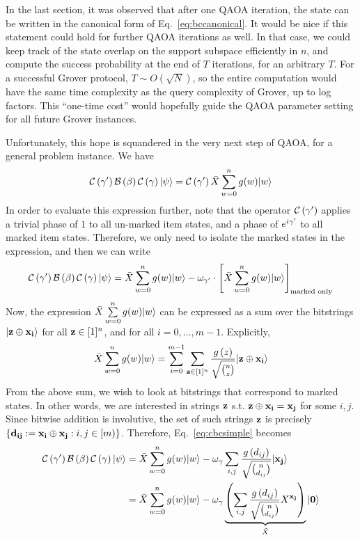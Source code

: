 \documentclass[11pt]{article}
\begin{document}
In the last section, it was observed that after one QAOA iteration, the state can be written in the canonical form of Eq.~\ref{eq:bccanonical}. It would be nice if this statement could hold for further QAOA iterations as well. In that case, we could keep track of the state overlap on the support subspace efficiently in $n$, and compute the success probability at the end of $T$ iterations, for an arbitrary $T$. For a successful Grover protocol, $T\sim O(\sqrt{N})$, so the entire computation would have the same time complexity as the query complexity of Grover, up to log factors. This ``one-time cost'' would hopefully guide the QAOA parameter setting for all future Grover instances.

Unfortunately, this hope is squandered in the very next step of QAOA, for a general problem instance. We have
\begin{equation}
  \label{eq:cbc}
  \mathcal{C}\left(\gamma^\prime\right)\mathcal{B}\left(\beta\right)\mathcal{C}\left(\gamma\right)|\psi\rangle = \mathcal{C}\left(\gamma^\prime\right)\bar{X}\sum\limits_{w=0}^{n}g(w)|w\rangle
\end{equation}
In order to evaluate this expression further, note that the operator $\mathcal{C}\left(\gamma^\prime\right)$ applies a trivial phase of $1$ to all un-marked item states, and a phase of $e^{i\gamma^\prime}$ to all marked item states. Therefore, we only need to isolate the marked states in the expression, and then we can write
\begin{equation}
  \label{eq:cbcsimple}
  \mathcal{C}\left(\gamma^\prime\right)\mathcal{B}\left(\beta\right)\mathcal{C}\left(\gamma\right)|\psi\rangle = \bar{X}\sum\limits_{w=0}^{n}g(w)|w\rangle - \omega_{\gamma^\prime}\cdot\left[\bar{X}\sum\limits_{w=0}^{n}g(w)|w\rangle\right]_{\text{marked only}}
\end{equation}
Now, the expression $\bar{X}\sum\limits_{w=0}^{n}g(w)|w\rangle$ can be expressed as a sum over the bitstrings $|\mathbf{z}\oplus \mathbf{x_i}\rangle$ for all $\mathbf{z}\in[1]^n$, and for all $i=0,\ldots,m-1$. Explicitly, 
$$
\bar{X}\sum\limits_{w=0}^{n}g(w)|w\rangle = \sum\limits_{i=0}^{m-1}\sum\limits_{\mathbf{z}\in[1]^n}^{}\frac{g\left(z\right)}{\sqrt{\binom{n}{z}}}|\mathbf{z}\oplus \mathbf{x_i}\rangle
$$
From the above sum, we wish to look at bitstrings that correspond to marked states. In other words, we are interested in strings $\mathbf{z}$ s.t. $\mathbf{z}\oplus \mathbf{x_i} =\mathbf{x_j} $ for some $i,j$. Since bitwise addition is involutive, the set of such strings $\mathbf{z}$ is precisely $\left\{\mathbf{d_{ij}}:=\mathbf{x_i}\oplus\mathbf{x_j}: i,j\in [m)\right\}$. Therefore, Eq.~\ref{eq:cbcsimple} becomes
\begin{align}
  \label{eq:cbcfinal}
  \mathcal{C}\left(\gamma^\prime\right)\mathcal{B}\left(\beta\right)\mathcal{C}\left(\gamma\right)|\psi\rangle &= \bar{X}\sum\limits_{w=0}^{n}g(w)|w\rangle - \omega_\gamma\sum\limits_{i,j}^{}\frac{g\left(d_{ij}\right)}{\sqrt{\binom{n}{d_{ij}}}}|\mathbf{x_j}\rangle\\
  &= \bar{X}\sum\limits_{w=0}^{n}g(w)|w\rangle - \omega_\gamma\underbrace{\left(\sum\limits_{i,j}^{}\frac{g\left(d_{ij}\right)}{\sqrt{\binom{n}{d_{ij}}}}X^{\mathbf{x_j}}\right)}_{\tilde{X}}|\mathbf{0}\rangle
\end{align}
\end{document}
